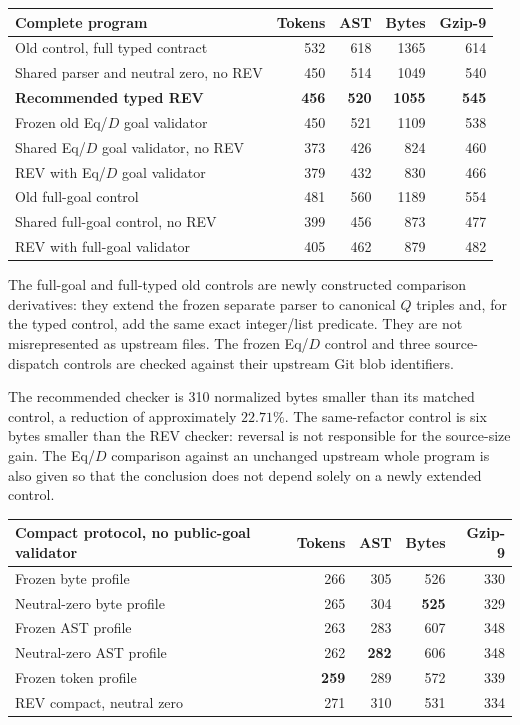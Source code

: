 \documentclass[11pt,letterpaper]{article}
\theoremstyle{definition}\newtheorem{definition}[theorem]{Definition}
\theoremstyle{remark}\newtheorem{remark}[theorem]{Remark}
\begin{document}
\begin{center}\small
\begin{tabular}{@{}lrrrr@{}}
\toprule
Complete program & Tokens & AST & Bytes & Gzip-9\\
\midrule
Old control, full typed contract & 532 & 618 & 1365 & 614\\
Shared parser and neutral zero, no REV & 450 & 514 & 1049 & 540\\
\textbf{Recommended typed REV} & \textbf{456} & \textbf{520} & \textbf{1055} & \textbf{545}\\
\midrule
Frozen old Eq/$D$ goal validator & 450 & 521 & 1109 & 538\\
Shared Eq/$D$ goal validator, no REV & 373 & 426 & 824 & 460\\
REV with Eq/$D$ goal validator & 379 & 432 & 830 & 466\\
Old full-goal control & 481 & 560 & 1189 & 554\\
Shared full-goal control, no REV & 399 & 456 & 873 & 477\\
REV with full-goal validator & 405 & 462 & 879 & 482\\
\bottomrule
\end{tabular}
\end{center}

The full-goal and full-typed old controls are newly constructed comparison
derivatives: they extend the frozen separate parser to canonical $Q$
triples and, for the typed control, add the same exact integer/list
predicate. They are not misrepresented as upstream files. The frozen
Eq/$D$ control and three source-dispatch controls are checked against
their upstream Git blob identifiers.

The recommended checker is 310 normalized bytes smaller than its
matched control, a reduction of approximately $22.71\%$. The
same-refactor control is six bytes smaller than the REV checker:
reversal is not responsible for the source-size gain. The Eq/$D$
comparison against an unchanged upstream whole program is also given
so that the conclusion does not depend solely on a newly extended
control.

\begin{center}\small
\begin{tabular}{@{}lrrrr@{}}
\toprule
Compact protocol, no public-goal validator & Tokens & AST & Bytes & Gzip-9\\
\midrule
Frozen byte profile & 266 & 305 & 526 & 330\\
Neutral-zero byte profile & 265 & 304 & \textbf{525} & 329\\
Frozen AST profile & 263 & 283 & 607 & 348\\
Neutral-zero AST profile & 262 & \textbf{282} & 606 & 348\\
Frozen token profile & \textbf{259} & 289 & 572 & 339\\
REV compact, neutral zero & 271 & 310 & 531 & 334\\
\bottomrule
\end{tabular}
\end{center}
\end{document}
